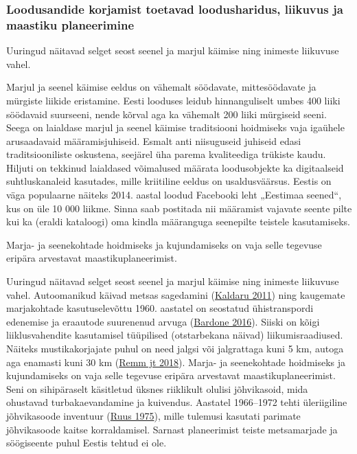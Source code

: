 \documentclass[estonian,]{article}
\begin{document}
\hypertarget{loodusandide-korjamist-toetavad-loodusharidus-liikuvus-ja-maastiku-planeerimine}{%
\subsubsection*{Loodusandide korjamist toetavad loodusharidus, liikuvus ja maastiku planeerimine}\label{loodusandide-korjamist-toetavad-loodusharidus-liikuvus-ja-maastiku-planeerimine}}

\begin{blockquote-right}
Uuringud näitavad selget seost seenel ja marjul käimise ning inimeste
liikuvuse vahel.
\end{blockquote-right}

Marjul ja seenel käimise eeldus on vähemalt söödavate, mittesöödavate ja mürgiste liikide eristamine. Eesti looduses leidub hinnanguliselt umbes 400 liiki söödavaid suurseeni, nende kõrval aga ka vähemalt 200 liiki mürgiseid seeni. Seega on laialdase marjul ja seenel käimise traditsiooni hoidmiseks vaja igaühele arusaadavaid määramisjuhiseid. Esmalt anti niisuguseid juhiseid edasi traditsiooniliste oskustena, seejärel üha parema kvaliteediga trükiste kaudu. Hiljuti on tekkinud laialdased võimalused määrata loodusobjekte ka digitaalseid suhtluskanaleid kasutades, mille kriitiline eeldus on usaldusväärsus. Eestis on väga populaarne näiteks 2014. aastal loodud Facebooki leht „Eestimaa seened``, kus on üle 10 000 liikme. Sinna saab postitada nii määramist vajavate seente pilte kui ka (eraldi kataloogi) oma kindla määranguga seenepilte teistele kasutamiseks.

\begin{blockquote-left}
Marja- ja seenekohtade hoidmiseks ja kujundamiseks on vaja selle
tegevuse eripära arvestavat maastikuplaneerimist.
\end{blockquote-left}

Uuringud näitavad selget seost seenel ja marjul käimise ning inimeste liikuvuse vahel. Autoomanikud käivad metsas sagedamini (\protect\hyperlink{Kaldaru2011}{Kaldaru 2011}) ning kaugemate marjakohtade kasutuselevõttu 1960. aastatel on seostatud ühistranspordi edenemise ja eraautode suurenenud arvuga (\protect\hyperlink{Bardone2016}{Bardone 2016}). Siiski on kõigi liiklusvahendite kasutamisel tüüpilised (otstarbekana näivad) liikumisraadiused. Näiteks mustikakorjajate puhul on need jalgsi või jalgrattaga kuni 5 km, autoga aga enamasti kuni 30 km (\protect\hyperlink{Remm2018}{Remm jt 2018}).
Marja- ja seenekohtade hoidmiseks ja kujundamiseks on vaja selle tegevuse eripära arvestavat maastikuplaneerimist. Seni on sihipäraselt käsitletud üksnes riiklikult olulisi jõhvikasoid, mida ohustavad turbakaevandamine ja kuivendus. Aastatel 1966--1972 tehti üleriigiline jõhvikasoode inventuur (\protect\hyperlink{Ruus1975}{Ruus 1975}), mille tulemusi kasutati parimate jõhvikasoode kaitse korraldamisel. Sarnast planeerimist teiste metsamarjade ja söögiseente puhul Eestis tehtud ei ole.
\end{document}
